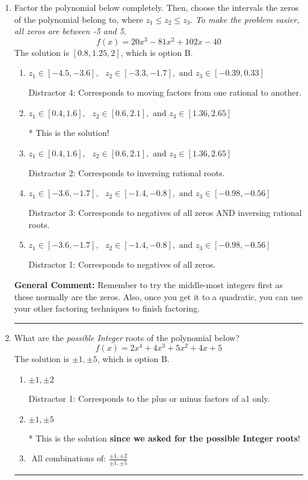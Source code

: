 \documentclass{extbook}[14pt]
\newcommand{\litem}[1]{\item #1

\rule{\textwidth}{0.4pt}}
\begin{document}
\begin{enumerate}\litem{
Factor the polynomial below completely. Then, choose the intervals the zeros of the polynomial belong to, where $z_1 \leq z_2 \leq z_3$. \textit{To make the problem easier, all zeros are between -5 and 5.}
\[ f(x) = 20x^{3} -81 x^{2} +102 x -40 \]The solution is \( [0.8, 1.25, 2] \), which is option B.\begin{enumerate}[label=\Alph*.]
\item \( z_1 \in [-4.5, -3.6], \text{   }  z_2 \in [-3.3, -1.7], \text{   and   } z_3 \in [-0.39, 0.33] \)

 Distractor 4: Corresponds to moving factors from one rational to another.
\item \( z_1 \in [0.4, 1.6], \text{   }  z_2 \in [0.6, 2.1], \text{   and   } z_3 \in [1.36, 2.65] \)

* This is the solution!
\item \( z_1 \in [0.4, 1.6], \text{   }  z_2 \in [0.6, 2.1], \text{   and   } z_3 \in [1.36, 2.65] \)

 Distractor 2: Corresponds to inversing rational roots.
\item \( z_1 \in [-3.6, -1.7], \text{   }  z_2 \in [-1.4, -0.8], \text{   and   } z_3 \in [-0.98, -0.56] \)

 Distractor 3: Corresponds to negatives of all zeros AND inversing rational roots.
\item \( z_1 \in [-3.6, -1.7], \text{   }  z_2 \in [-1.4, -0.8], \text{   and   } z_3 \in [-0.98, -0.56] \)

 Distractor 1: Corresponds to negatives of all zeros.
\end{enumerate}

\textbf{General Comment:} Remember to try the middle-most integers first as these normally are the zeros. Also, once you get it to a quadratic, you can use your other factoring techniques to finish factoring.
}
\litem{
What are the \textit{possible Integer} roots of the polynomial below?
\[ f(x) = 2x^{4} +4 x^{3} +5 x^{2} +4 x + 5 \]The solution is \( \pm 1,\pm 5 \), which is option B.\begin{enumerate}[label=\Alph*.]
\item \( \pm 1,\pm 2 \)

 Distractor 1: Corresponds to the plus or minus factors of a1 only.
\item \( \pm 1,\pm 5 \)

* This is the solution \textbf{since we asked for the possible Integer roots}!
\item \( \text{ All combinations of: }\frac{\pm 1,\pm 2}{\pm 1,\pm 5} \)


\end{enumerate}}
\end{enumerate}
\end{document}
